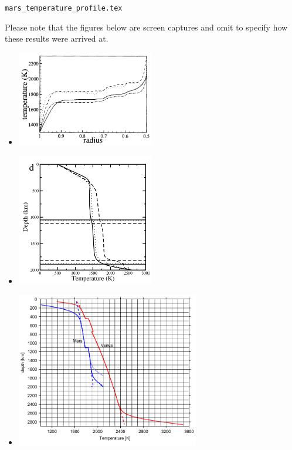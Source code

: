 \begin{flushright} {\tiny {\color{gray} \tt mars\_temperature\_profile.tex}} \end{flushright}

Please note that the figures below are screen captures and omit to 
specify how these results were arrived at. 

\begin{itemize}


\item {}

\begin{center}
\includegraphics[width=6cm]{images/mars/temperature/brys97}
\end{center}

\item {}

\begin{center}
\includegraphics[width=6cm]{images/mars/temperature/rozh06}
\end{center}

\item {}

\begin{center}
\includegraphics[width=8cm]{images/mars/temperature/stwt10}
\end{center}


\end{itemize}
